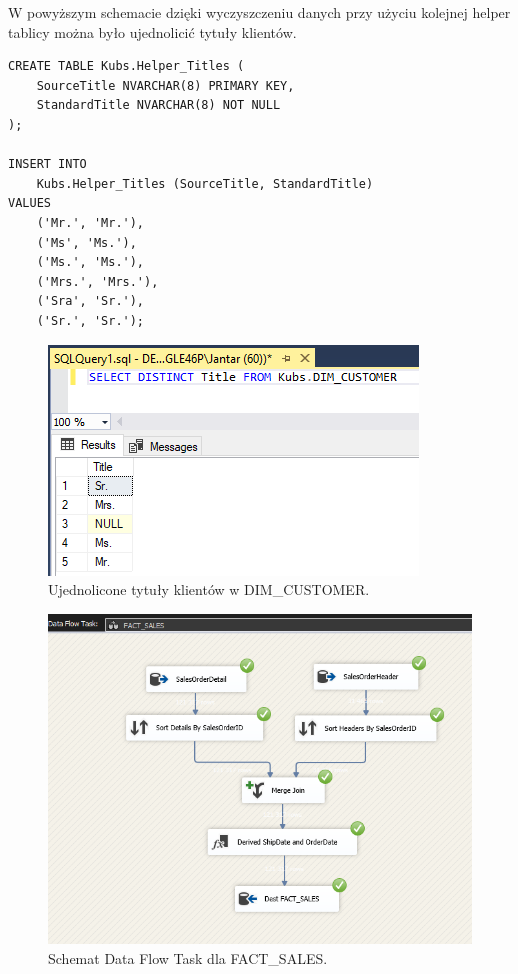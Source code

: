 \documentclass[a4paper,12pt]{article}
\begin{document}
W powyższym schemacie dzięki wyczyszczeniu danych przy użyciu kolejnej helper tablicy można było ujednolicić tytuły klientów.

\begin{lstlisting}
CREATE TABLE Kubs.Helper_Titles (
    SourceTitle NVARCHAR(8) PRIMARY KEY,
    StandardTitle NVARCHAR(8) NOT NULL
);

INSERT INTO
    Kubs.Helper_Titles (SourceTitle, StandardTitle)
VALUES
    ('Mr.', 'Mr.'),
    ('Ms', 'Ms.'),
    ('Ms.', 'Ms.'),
    ('Mrs.', 'Mrs.'),
    ('Sra', 'Sr.'),
    ('Sr.', 'Sr.');
\end{lstlisting}

\begin{figure}[H]
    \centering
    \includegraphics[width=\textwidth]{images/5_lookup_fix.png}
    \caption{Ujednolicone tytuły klientów w DIM\_CUSTOMER.}
    \label{fig:zad5_dft_other_dim_fixed}
\end{figure}

\begin{figure}[H]
    \centering
    \includegraphics[width=\textwidth]{images/5_sales.png}
    \caption{Schemat Data Flow Task dla FACT\_SALES.}
\end{figure}
\end{document}
